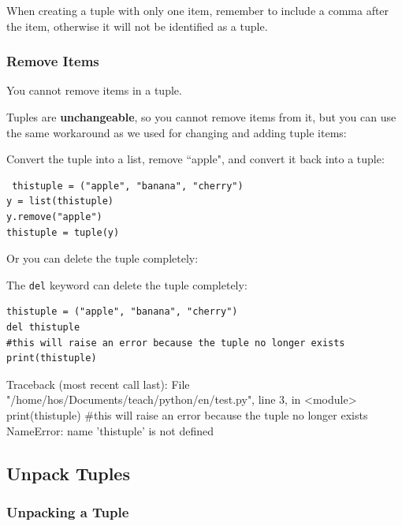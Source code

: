 \documentclass[12pt,a4paper]{article}
\newcommand{\lcode}[1]{%
	\lstinline{#1}%
}
\begin{document}
\begin{nbox}
When creating a tuple with only one item, remember to include a comma
after the item, otherwise it will not be identified as a tuple.
\end{nbox}
\subsubsection{Remove Items}

\begin{nbox}
You cannot remove items in a tuple.
\end{nbox}

Tuples are \textbf{unchangeable}, so you cannot remove items from it, but you
can use the same workaround as we used for changing and adding tuple items:

\begin{ebox}
Convert the tuple into a list, remove ``apple", and convert it back into a tuple:
	\begin{lstlisting}
 thistuple = ("apple", "banana", "cherry")
y = list(thistuple)
y.remove("apple")
thistuple = tuple(y)
	\end{lstlisting}
\end{ebox}

Or you can delete the tuple completely:

\begin{abox}
The \lcode{del} keyword can delete the tuple completely:
	\begin{lstlisting}
thistuple = ("apple", "banana", "cherry")
del thistuple
#this will raise an error because the tuple no longer exists
print(thistuple)
	\end{lstlisting}
\tcblower
	\begin{vercode}
Traceback (most recent call last):
  File "/home/hos/Documents/teach/python/en/test.py", line 3,
  in <module>
    print(thistuple) #this will raise an error
    because the tuple no longer exists
NameError: name 'thistuple' is not defined
	\end{vercode}
\end{abox}
\subsection{Unpack Tuples}\label{pyUnpackTuple}

\subsubsection{Unpacking a Tuple}
\end{document}

